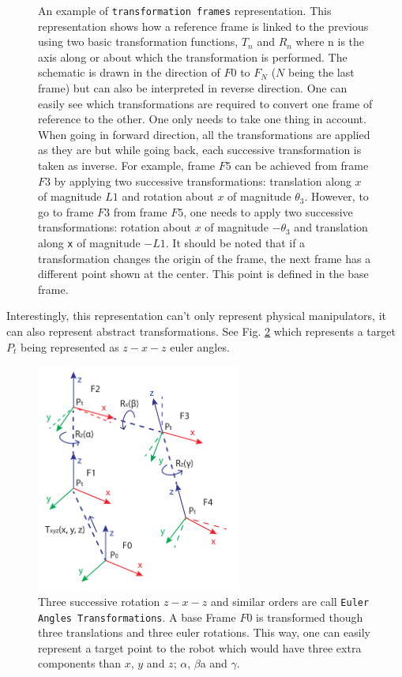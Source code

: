 {{\begin{figure}
          \caption{An example of \texttt{transformation frames} representation. This representation shows how a reference frame is linked to the previous using two basic transformation functions, $T_n$ and $R_n$ where n is the axis along or about which the transformation is performed. The schematic is drawn in the direction of $F0$ to $F_N$ ($N$ being the last frame) but can also be interpreted in reverse direction. One can easily see which transformations are required to convert one frame of reference to the other. One only needs to take one thing in account. When going in forward direction, all the transformations are applied as they are but while going back, each successive transformation is taken as inverse. For example, frame $F5$ can be achieved from frame $F3$ by applying two successive transformations: translation along $x$ of magnitude $L1$ and rotation about $x$ of magnitude $\theta_3$. However, to go to frame $F3$ from frame $F5$, one needs to apply two successive transformations: rotation about $x$ of magnitude $-\theta_3$ and translation along \texttt{x} of magnitude $-L1$. It should be noted that if a transformation changes the origin of the frame, the next frame has a different point shown at the center. This point is defined in the base frame.
          } \label{FigMyRep}
        \end{figure}

        Interestingly, this representation can't only represent physical manipulators, it can also represent abstract transformations. See Fig. \ref{FigEulerRep} which represents a target $P_t$ being represented as $z-x-z$ euler angles.

        \begin{figure}
          \centering
          \includegraphics[width=0.6\textwidth]{../Images/EulerANgles.pdf}
          \caption{Three successive rotation $z-x-z$ and similar orders are call \texttt{Euler Angles Transformations}. A base Frame $F0$ is transformed though three translations and three euler rotations. This way, one can easily represent a target point to the robot which would have three extra components than $x$, $y$ and $z$; $\alpha$, $\beta$a and $\gamma$.
          } \label{FigEulerRep}
        \end{figure}

}}
